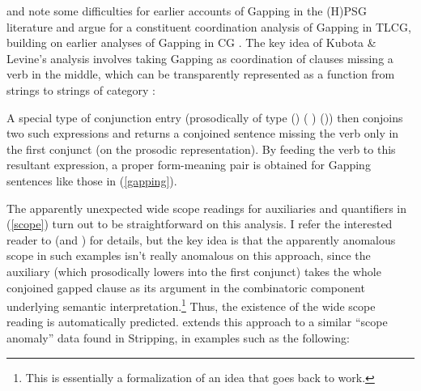 \documentclass[output=paper
                ,modfonts
 	        ,biblatex
                ,babelshorthands
                ,newtxmath
                ,draftmode
                ,colorlinks, citecolor=brown
]{langscibook}
\begin{document}
\citet{kubota-levine-gapping} and 
\citet[Section~3.1]{KubotaLevineBook} note some
difficulties for earlier accounts of Gapping in the (H)PSG literature
\citep{sgww,abeille-ea} and argue for a constituent coordination
analysis of Gapping in TLCG, building on earlier analyses of Gapping
in CG \citep{Steedman90a-u,hendriks95,morrillsolias93}. The key idea
of Kubota \& Levine's analysis involves taking Gapping as coordination of clauses
missing a verb in the middle, which can be transparently represented
as a function from strings to strings of category {}:

\begin{exe}
 \ex
  \LexEnt{\pt{\ensuremath{\lambda} \ensuremath{\greekp}. leslie \ensuremath{\circ}\xspace \ensuremath{\greekp} \ensuremath{\circ}\xspace a \ensuremath{\circ}\xspace cd }}{\sem{ \lambda R. \exists x. \trns{cd}(x) \ensuremath{ \wedge\xspace } R(x)(\trns{l}) }}{\syncat{S\vs ((NP\ensuremath{\backslash}{}S)/NP)}}
\end{exe}
A special type of conjunction entry (prosodically of type
(\yusukest\xspace \shortarrow \yusukest\xspace) \shortarrow (\yusukest\xspace
\shortarrow \yusukest\xspace) \shortarrow (\yusukest\xspace \shortarrow \yusukest\xspace))
then conjoins two such expressions
and returns a conjoined sentence missing the verb only in the first
conjunct (on the prosodic representation). By feeding the verb to
this resultant expression,  a proper form-meaning  pair is obtained
for Gapping sentences like those in (\ref{gapping}).

The apparently unexpected wide scope readings for auxiliaries and
quantifiers in (\ref{scope}) turn out to be straightforward on this
analysis. I refer the interested reader to
\citet{kubota-levine-gapping} (and \citet[Chapter~3]{KubotaLevineBook}) for
details, but the key idea is that the apparently anomalous scope in
such examples isn't really anomalous on this approach, since the
auxiliary (which prosodically lowers into the first conjunct) takes
the whole conjoined gapped clause as its argument in the combinatoric
component underlying semantic interpretation.\footnote{This is
  essentially a formalization of an idea that goes back to
   work.} Thus, the existence
of the wide scope reading is automatically predicted.
\citet{puthawala2018} extends this approach to a similar ``scope anomaly''
data found in Stripping, in examples such as the following:
\end{document}
